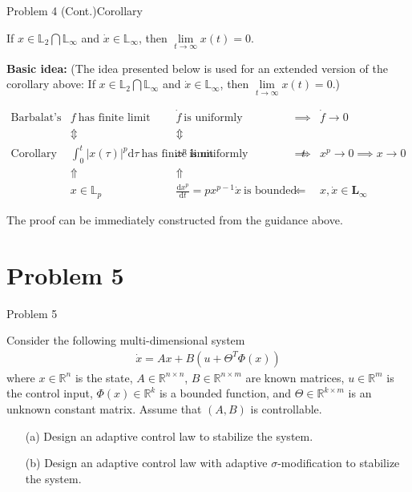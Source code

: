 \documentclass[8pt]{beamer}
\begin{document}
\begin{frame}[t]{Problem 4 (Cont.)}{Corollary}
  \begin{corollary}
    If $x\in \mathbb{L}_2\bigcap\mathbb{L}_{\infty}$ and $\dot x\in \mathbb{L}_{\infty}$, then $\lim\limits_{t\to\infty}x(t)=0$.
  \end{corollary}
  \textbf{Basic idea:} (The idea presented below is used for an extended version of the corollary above: If $x\in \mathbb{L}_2\bigcap\mathbb{L}_{\infty}$ and $\dot x\in \mathbb{L}_{\infty}$, then $\lim\limits_{t\to\infty}x(t)=0$.)

  {\small\[\begin{matrix}
    \text{Barbalat's lemma}&f\ \text{has finite limit} & \dot{f}\ \text{is uniformly continuous} & \implies & \dot{f}\to 0\\
    &\Updownarrow & \Updownarrow & &\\
    \text{Corollary}&\int^t_0  |x (\tau)|^p \mathrm{d} \tau\ \text{has finite limit} & x^p\ \text{is uniformly continuous in}\ t & \implies & x^p\to 0 \implies x\to 0\\
    &\Uparrow &\Uparrow && \\
    & x\in\mathbb{L}_p& \frac{\mathrm{d} x^p}{\mathrm{d} t}=px^{p-1}\dot{x}\ \text{is bounded}&\Leftarrow&x,\dot{x}\in \mathbf{L}_\infty
  \end{matrix}\]}

  The proof can be immediately constructed from the guidance above.
\end{frame}

\section{Problem 5}

\begin{frame}[t]{Problem 5}
  \begin{block}{}
    Consider the following multi-dimensional system
\begin{align*}
\dot x = A x +B(u+\Theta^T\Phi(x))
\end{align*}
where $x\in\mathbb{R}^n$ is the state, $A\in\mathbb{R}^{n\times n}$, $B\in\mathbb{R}^{n\times m}$ are known matrices, $u\in\mathbb{R}^m$ is the control input, $\Phi(x)\in\mathbb{R}^{k}$ is a bounded function, and $\Theta\in \mathbb{R}^{k\times m}$ is an unknown constant matrix. Assume that $(A,B)$ is controllable.
\begin{itemize}
  \item[(a)] Design an adaptive control law to stabilize the system.
  \item[(b)] Design an adaptive control law with adaptive $\sigma$-modification to stabilize the system.
\end{itemize}
  \end{block}
\end{frame}
\end{document}
